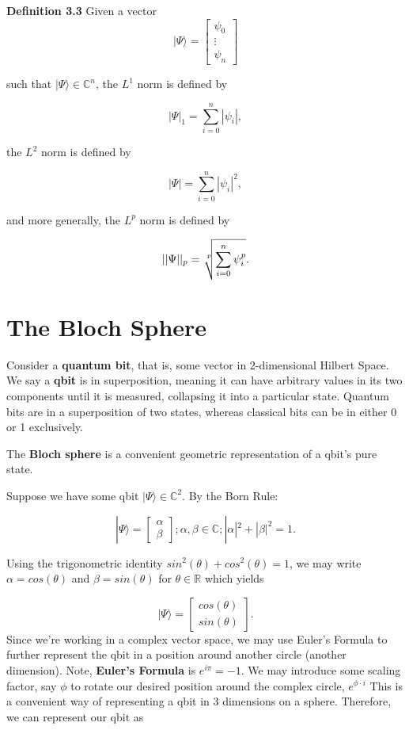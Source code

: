 \documentclass[letterpaper, 10 pt, conference]{ieeeconf}
\begin{document}
\textbf{Definition 3.3} Given a vector
\[
|\Psi\rangle =
\begin{bmatrix} \psi_0 \\ \vdots \\ \psi_n \end{bmatrix}
\]

such that \( |\Psi\rangle \in \mathbb{C}^n \), the \( L^1 \) norm is defined by

\[
|\Psi|_1 = \sum_{i = 0}^n |\psi_i|,
\]

the \( L^2 \) norm is defined by

\[
|\Psi| = \sum_{i = 0}^n |\psi_i|^2,
\]

and more generally, the \( L^p \) norm is defined by

\[
||\Psi||_p = 
\sqrt[\leftroot{-2}\uproot{2}p]{ \sum_{i = 0}^n \psi_i^p }.
\]

\section{The Bloch Sphere}

Consider a \textbf{quantum bit}, that is, some vector in 2-dimensional Hilbert Space.  We say a \textbf{qbit} is in superposition, meaning it can have arbitrary values in its two components until it is measured, collapsing it into a particular state.  Quantum bits are in a superposition of two states, whereas classical bits can be in either 0 or 1 exclusively.

The \textbf{Bloch sphere} is a convenient geometric representation of a qbit's pure state.

Suppose we have some qbit \( |\Psi\rangle \in \mathbb{C}^2 \).  By the Born Rule:

\[ |\Psi\rangle =
\begin{bmatrix} \alpha \\ \beta \end{bmatrix};  \alpha, \beta \in \mathbb{C};  |\alpha|^2 + |\beta|^2 = 1.
\]

Using the trigonometric identity \( sin^2(\theta) + cos^2(\theta) = 1 \), we may write \( \alpha = cos(\theta) \) and \( \beta = sin(\theta) \) for \( \theta \in \mathbb{R} \) which yields

\[
|\Psi\rangle = \begin{bmatrix} cos(\theta) \\ sin(\theta) \end{bmatrix}.
\]  Since we're working in a complex vector space, we may use Euler's Formula to further represent the qbit in a position around another circle (another dimension).  Note, \textbf{Euler's Formula} is \( e^{i\pi} = -1 \).  We may introduce some scaling factor, say \( \phi \) to rotate our desired position around the complex circle, \( e^{\phi \cdot i} \) This is a convenient way of representing a qbit in 3 dimensions on a sphere.  Therefore, we can represent our qbit as
\end{document}
